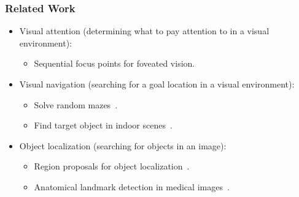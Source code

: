 \begin{frame}
    \frametitle{Related Work}

    \begin{itemize}
        \item Visual attention (determining what to pay attention to in a visual environment):
        \begin{itemize}
            \item Sequential focus points for foveated vision.~\cite{mnih_recurrent_2014}
        \end{itemize}
        \item Visual navigation (searching for a goal location in a visual environment):
        \begin{itemize}
            \item Solve random mazes~\cite{mirowski_learning_2017}.
            \item Find target object in indoor scenes~\cite{zhu_target-driven_2017}.
        \end{itemize}
        \item Object localization (searching for objects in an image):
        \begin{itemize}
            \item Region proposals for object localization~\cite{caicedo_active_2015}.
            \item Anatomical landmark detection in medical images~\cite{ghesu_multi-scale_2019}.
        \end{itemize}
    \end{itemize}
\end{frame}